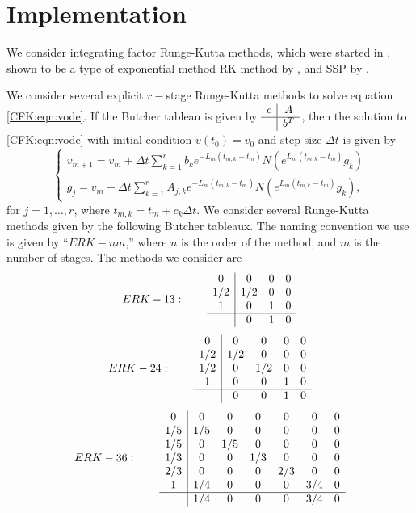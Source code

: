 \documentclass{csri19}
\begin{document}
\section{Implementation}\label{CFK:sec:implementation}
We consider integrating factor Runge-Kutta methods, which were started in
\cite{CFK:Lawson1969}, shown to be a type of exponential method RK method by
\cite{CFK:Minchev2006}, and SSP by \cite{CFK:Isherwood2018}.

We consider several explicit $r-$stage Runge-Kutta methods to solve equation
\ref{CFK:eqn:vode}. If the Butcher tableau is given by $\begin{array}{c|c}
c & A \\ \hline & b^T \end{array}$, then the solution to \ref{CFK:eqn:vode} with
initial condition $v(t_0) = v_0$ and step-size $\Delta t$ is given by
\[ \left\{\begin{array}{l} v_{m+1} = v_m + \Delta t\sum_{k=1}^r b_k 
                         e^{-L_m(t_{m,k}-t_m)}N(e^{L_m(t_{m,k}-t_m)}g_k) \\
          g_j = v_m + \Delta t \sum_{k=1}^r A_{j,k} e^{-L_m(t_{m,k} - t_m)} 
                      N(e^{L_m(t_{m,k}-t_m)}g_k), \end{array} \right. \]
for $j = 1,\dots,r$, where $t_{m,k} = t_m + c_k \Delta t$.
We consider several Runge-Kutta methods given by the
following Butcher tableaux. The naming convention we use is given by ``$ERK
-nm$,'' where $n$ is the order of the method, and $m$ is the number of
stages. The methods we consider are
\[ ERK-13: \qquad
 \begin{array}{c|ccc}
0   & 0   & 0 & 0\\
1/2 & 1/2 & 0 & 0\\
1   & 0   & 1 & 0\\
\hline
    & 0   & 1 & 0
\end{array}\]
\[ ERK-24: \qquad
\begin{array}{c|cccc}
0   & 0   & 0   & 0 & 0\\
1/2 & 1/2 & 0   & 0 & 0\\
1/2 & 0   & 1/2 & 0 & 0\\
1   & 0   & 0   & 1 & 0\\
\hline
    & 0   & 0   & 1 & 0
\end{array}\]
\[ ERK-36: \qquad
\begin{array}{c|cccccc}
0   & 0   & 0   & 0   & 0   & 0   & 0\\
1/5 & 1/5 & 0   & 0   & 0   & 0   & 0\\
1/5 & 0   & 1/5 & 0   & 0   & 0   & 0\\
1/3 & 0   & 0   & 1/3 & 0   & 0   & 0\\
2/3 & 0   & 0   & 0   & 2/3 & 0   & 0\\
1   & 1/4 & 0   & 0   & 0   & 3/4 & 0\\
\hline
    & 1/4 & 0   & 0   & 0   & 3/4 & 0
\end{array}\]
\end{document}
